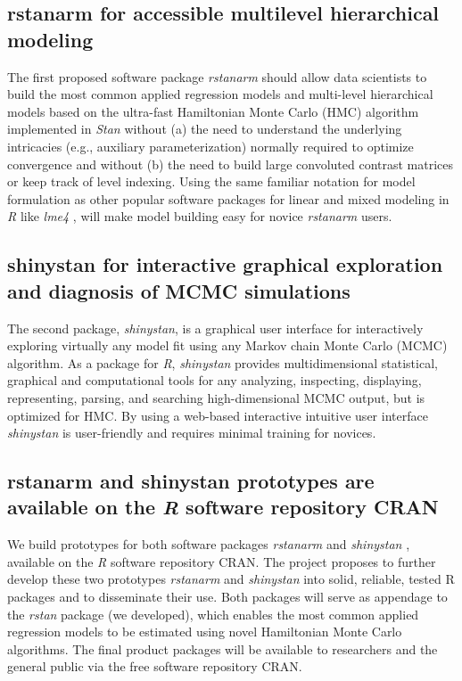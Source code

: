 \documentclass[11pt,notitlepage]{article}
\begin{document}
\subsection*{rstanarm for accessible multilevel hierarchical modeling}
The first proposed software package \textit{rstanarm} should allow data scientists to build the most common applied regression models and multi-level hierarchical models based on the ultra-fast Hamiltonian Monte Carlo (HMC) algorithm implemented in \textit{Stan} without (a) the need to understand the underlying intricacies (e.g., auxiliary parameterization) normally required to optimize convergence and without (b) the need to build large convoluted contrast matrices  or keep track of level indexing. Using the same familiar notation for model formulation as other popular software packages for linear and mixed modeling in \textit{R} like \textit{lme4} \cite{lme4}, will make model building easy for novice \textit{rstanarm} users. 

\subsection*{shinystan for interactive graphical exploration and diagnosis of MCMC simulations}  
The second package, \textit{shinystan}, is a graphical user interface for interactively exploring virtually any model fit using any Markov chain Monte Carlo (MCMC) algorithm. As a package for \textit{R}, \textit{shinystan}  provides multidimensional statistical, graphical and computational tools for any analyzing, inspecting, displaying, representing, parsing, and searching high-dimensional MCMC output, but is optimized for HMC. By using a web-based interactive intuitive user interface \textit{shinystan} is user-friendly and requires minimal training for novices.

\subsection*{rstanarm and shinystan prototypes are available on the \textit{R} software repository CRAN}
We build prototypes for both software packages \textit{rstanarm} \cite{rstanarm} and \textit{shinystan} \cite{shinystan, Team2015}, available on the \textit{R} software repository CRAN. The project proposes to further develop these two prototypes \textit{rstanarm} and \textit{shinystan} into solid, reliable, tested R packages and to disseminate their use. Both packages will serve as appendage to the \textit{rstan} package (we developed), which enables the most common applied regression models to be estimated using novel Hamiltonian Monte Carlo algorithms. The final product packages will be available to researchers and the general public via the free software repository CRAN. 
\end{document}
